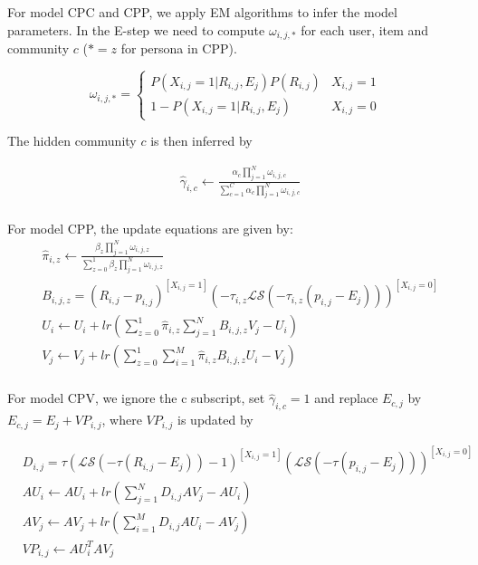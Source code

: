 \documentclass[sigconf]{acmart}
\begin{document}
For model CPC and CPP, we apply EM algorithms to infer the model parameters. In the E-step we need to compute $\omega_{i,j,*}$ for each user, item and community $c$ ($*=z$ for persona in CPP).

\begin{equation}
\omega_{i,j,*}=
\begin{cases}
P(X_{i,j}=1|R_{i,j},E_{j})P(R_{i,j})& \text{$X_{i,j}=1$}\\\nonumber
1-P(X_{i,j}=1|R_{i,j},E_{j})& \text{$X_{i,j}=0$}
\end{cases}
\end{equation}

The hidden community $c$ is then inferred by

\begin{equation}\label{equ:updateCPC}
\begin{split}
&\hat{\gamma}_{i,c}\leftarrow\frac{\alpha_c\prod_{j=1}^{N}\omega_{i,j,c}}{\sum_{c=1}^{C}\alpha_c\prod_{j=1}^{N}\omega_{i,j,c}} \\
\end{split}
\end{equation}

For model CPP, the update equations are given by:
\begin{equation}
\begin{split}
&\hat{\pi}_{i,z}\leftarrow\frac{\beta_z\prod_{j=1}^{N}\omega_{i,j,z}}{\sum_{z=0}^{1}\beta_z\prod_{j=1}^{N}\omega_{i,j,z}} \\
&B_{i,j,z}=(R_{i,j}-p_{i,j})^{[X_{i,j}=1]}(-\tau_{i,z}\mathcal{LS}(-\tau_{i,z}(p_{i,j}-E_{j})))^{[X_{i,j}=0]} \\
&U_{i}\leftarrow U_{i}+lr(\sum\limits_{z=0}^{1}\hat{\pi}_{i,z}\sum\limits_{j=1}^{N}B_{i,j,z}V_j-U_{i}) \\
&V_j\leftarrow V_j+lr(\sum\limits_{z=0}^{1}\sum\limits_{i=1}^{M}\hat{\pi}_{i,z}B_{i,j,z}U_{i}-V_j) \\
\end{split}
\end{equation}

For  model CPV,  we ignore the c subscript, set $\hat{\gamma}_{i,c}=1$ and replace $E_{c,j}$ by $E_{c,j}=E_{j}+VP_{i,j}$, where $VP_{i,j}$ is updated by

\begin{equation}
\begin{split}
&D_{i,j}=\tau(\mathcal{LS}(-\tau(R_{i,j}-E_{j}))-1)^{[X_{i,j}=1]}(\mathcal{LS}(-\tau(p_{i,j}-E_{j})))^{[X_{i,j}=0]} \\
&AU_{i}\leftarrow AU_{i}+lr(\sum\limits_{j=1}^{N}D_{i,j}AV_j-AU_{i}) \\
&AV_{j}\leftarrow AV_{j}+lr(\sum\limits_{i=1}^{M}D_{i,j}AU_{i}-AV_j) \\
&VP_{i,j} \leftarrow AU_{i}^{T}AV_{j} \\
\end{split}
\end{equation}
\end{document}
